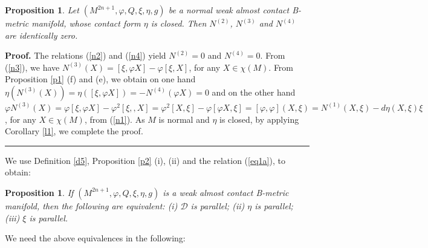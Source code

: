 \documentclass{article}
\newtheorem{definition}[theorem]{Definition}
\newtheorem{proposition}[theorem]{Proposition}
\newenvironment{proof}[1][Proof]{\noindent\textbf{#1.} }{\ \rule{0.5em}{0.5em}}
\begin{document}
\begin{proposition} \label{p3}
	Let $(M^{2n+1},\varphi,Q,\xi,\eta,g)$ be a normal weak almost contact B-metric manifold, whose contact form $\eta$ is closed. Then $N^{(2)}$, $N^{(3)}$ and $N^{(4)}$ are identically zero.
\end{proposition}

\begin{proof}
	The relations (\ref{n2}) and (\ref{n4}) yield $N^{(2)}=0$ and $N^{(4)}=0$. From (\ref{n3}), we have $N^{(3)}(X)= [\xi,\varphi X]-\varphi[\xi,X]$, for any $X\in\chi(M)$. From Proposition \ref{p1} (f) and (e), we obtain on one hand $\eta(N^{(3)}(X))=\eta([\xi,\varphi X])=-N^{(4)}(\varphi X)=0$ and on the other hand $\varphi N^{(3)}(X)=\varphi[\xi,\varphi X]-\varphi^2[\xi,,X]=\varphi^2[X,\xi]-\varphi[\varphi X,\xi]=[\varphi,\varphi](X,\xi)=N^{(1)}(X,\xi)-d\eta(X,\xi)\xi$, for any $X\in\chi(M)$, from (\ref{n1}). As $M$ is normal and $\eta$ is closed, by applying Corollary \ref{l1}, we complete the proof.	
\end{proof}\medskip


  
We use Definition \ref{d5}, Proposition \ref{p2} (i), (ii) and the relation (\ref{eq1a}), to obtain:

\begin{proposition} \label{p4}
	If $(M^{2n+1},\varphi,Q,\xi,\eta,g)$ is a weak almost contact B-metric manifold, then the following are equivalent: (i) $\mathcal{D}$ is parallel;  (ii) $\eta$ is parallel;  (iii) $\xi$ is parallel.\medskip
\end{proposition}

We need the above equivalences in the following:
\end{document}
